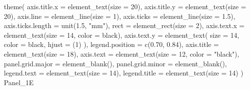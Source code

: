 \documentclass[
]{krantz}
\makeatletter
\newenvironment{Shaded}{\begin{snugshade}}{\end{snugshade}}
\newcommand{\AttributeTok}[1]{\textcolor[rgb]{0.77,0.63,0.00}{#1}}
\newcommand{\DecValTok}[1]{\textcolor[rgb]{0.00,0.00,0.81}{#1}}
\newcommand{\FloatTok}[1]{\textcolor[rgb]{0.00,0.00,0.81}{#1}}
\newcommand{\FunctionTok}[1]{\textcolor[rgb]{0.00,0.00,0.00}{#1}}
\newcommand{\NormalTok}[1]{#1}
\newcommand{\StringTok}[1]{\textcolor[rgb]{0.31,0.60,0.02}{#1}}
\newenvironment{kframe}{%
\medskip{}
\setlength{\fboxsep}{.8em}
 \def\at@end@of@kframe{}%
 \ifinner\ifhmode%
  \def\at@end@of@kframe{\end{minipage}}%
  \begin{minipage}{\columnwidth}%
 \fi\fi%
 \def\FrameCommand##1{\hskip\@totalleftmargin \hskip-\fboxsep
 \colorbox{shadecolor}{##1}\hskip-\fboxsep
     \hskip-\linewidth \hskip-\@totalleftmargin \hskip\columnwidth}%
 \MakeFramed {\advance\hsize-\width
   \@totalleftmargin\z@ \linewidth\hsize
   \@setminipage}}%
 {\par\unskip\endMakeFramed%
 \at@end@of@kframe}
\renewenvironment{Shaded}{\begin{kframe}}{\end{kframe}}
\makeatother
\begin{document}
\begin{Shaded}
\begin{Highlighting}[]
  \FunctionTok{theme}\NormalTok{(}
    \AttributeTok{axis.title.x =} \FunctionTok{element\_text}\NormalTok{(}\AttributeTok{size =} \DecValTok{20}\NormalTok{),}
    \AttributeTok{axis.title.y =} \FunctionTok{element\_text}\NormalTok{(}\AttributeTok{size =} \DecValTok{20}\NormalTok{),}
    \AttributeTok{axis.line =} \FunctionTok{element\_line}\NormalTok{(}\AttributeTok{size =} \DecValTok{1}\NormalTok{),}
    \AttributeTok{axis.ticks =} \FunctionTok{element\_line}\NormalTok{(}\AttributeTok{size =} \FloatTok{1.5}\NormalTok{),}
    \AttributeTok{axis.ticks.length =} \FunctionTok{unit}\NormalTok{(}\FloatTok{1.5}\NormalTok{, }\StringTok{"mm"}\NormalTok{),}
    \AttributeTok{rect =} \FunctionTok{element\_rect}\NormalTok{(}\AttributeTok{size =} \DecValTok{2}\NormalTok{),}
    \AttributeTok{axis.text.x =} \FunctionTok{element\_text}\NormalTok{(}\AttributeTok{size =} \DecValTok{14}\NormalTok{, }\AttributeTok{color =} \StringTok{\textquotesingle{}black\textquotesingle{}}\NormalTok{),}
    \AttributeTok{axis.text.y =}
      \FunctionTok{element\_text}\NormalTok{(}
        \AttributeTok{size =} \DecValTok{14}\NormalTok{,}
        \AttributeTok{color =} \StringTok{\textquotesingle{}black\textquotesingle{}}\NormalTok{,}
        \AttributeTok{hjust =}\NormalTok{ (}\DecValTok{1}\NormalTok{)}
\NormalTok{      ),}
    \AttributeTok{legend.position =} \FunctionTok{c}\NormalTok{(}\FloatTok{0.70}\NormalTok{, }\FloatTok{0.84}\NormalTok{),}
    \AttributeTok{axis.title =} \FunctionTok{element\_text}\NormalTok{(}\AttributeTok{size =} \DecValTok{18}\NormalTok{),}
    \AttributeTok{axis.text =} \FunctionTok{element\_text}\NormalTok{(}\AttributeTok{size =} \DecValTok{12}\NormalTok{, }\AttributeTok{color =} \StringTok{"black"}\NormalTok{),}
    \AttributeTok{panel.grid.major =} \FunctionTok{element\_blank}\NormalTok{(),}
    \AttributeTok{panel.grid.minor =} \FunctionTok{element\_blank}\NormalTok{(),}
    \AttributeTok{legend.text =} \FunctionTok{element\_text}\NormalTok{(}\AttributeTok{size =} \DecValTok{14}\NormalTok{),}
    \AttributeTok{legend.title =} \FunctionTok{element\_text}\NormalTok{(}\AttributeTok{size =} \DecValTok{14}\NormalTok{)}
\NormalTok{  )}
\NormalTok{Panel\_1E}
\end{Highlighting}
\end{Shaded}
\end{document}
